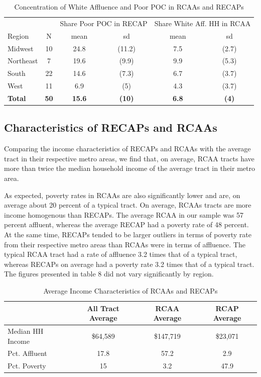 \documentclass[11pt,]{article}
\begin{document}
\begin{table}[t]

\caption{\label{tab:table7}Concentration of White Affluence and Poor POC in RCAAs and RECAPs}
\centering
\begin{tabular}{lccccc}
\toprule
\multicolumn{2}{c}{ } & \multicolumn{2}{c}{Share Poor POC in RECAP} & \multicolumn{2}{c}{Share White Aff. HH in RCAA} \\
\cmidrule(l{3pt}r{3pt}){3-4} \cmidrule(l{3pt}r{3pt}){5-6}
Region & N & mean & sd & mean & sd\\
\midrule
Midwest & 10 & 24.8 & (11.2) & 7.5 & (2.7)\\
Northeast & 7 & 19.6 & (9.9) & 9.9 & (5.3)\\
South & 22 & 14.6 & (7.3) & 6.7 & (3.7)\\
West & 11 & 6.9 & (5) & 4.3 & (3.7)\\
\textbf{Total} & \textbf{50} & \textbf{15.6} & \textbf{(10)} & \textbf{6.8} & \textbf{(4)}\\
\bottomrule
\end{tabular}
\end{table}

\hypertarget{characteristics-of-recaps-and-rcaas}{%
\subsection{Characteristics of RECAPs and
RCAAs}\label{characteristics-of-recaps-and-rcaas}}

Comparing the income characteristics of RECAPs and RCAAs with the
average tract in their respective metro areas, we find that, on average,
RCAA tracts have more than twice the median household income of the
average tract in their metro area.

As expected, poverty rates in RCAAs are also significantly lower and
are, on average about 20 percent of a typical tract. On average, RCAAs
tracts are more income homogenous than RECAPs. The average RCAA in our
sample was 57 percent affluent, whereas the average RECAP had a poverty
rate of 48 percent. At the same time, RECAPs tended to be larger
outliers in terms of poverty rate from their respective metro areas than
RCAAs were in terms of affluence. The typical RCAA tract had a rate of
affluence 3.2 times that of a typical tract, whereas RECAPs on average
had a poverty rate 3.2 times that of a typical tract. The figures
presented in table 8 did not vary significantly by region.

\begin{table}[t]

\caption{\label{tab:table8}Average Income Characteristics of RCAAs and RECAPs}
\centering
\begin{tabular}{lccc}
\toprule
  & All Tract Average & RCAA Average & RCAP Average\\
\midrule
Median HH Income & \$64,589 & \$147,719 & \$23,071\\
Pct. Affluent & 17.8 & 57.2 & 2.9\\
Pct. Poverty & 15 & 3.2 & 47.9\\
\bottomrule
\end{tabular}
\end{table}
\end{document}
